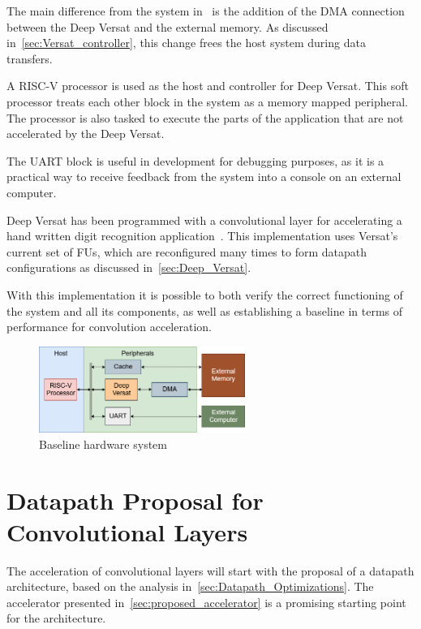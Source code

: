 The main difference from the system in~\cite{VMario:Deep_Versat} is the addition
of the DMA connection between the Deep Versat and the external memory. As
discussed in~\ref{sec:Versat_controller}, this change frees the host system
during data transfers.

A RISC-V processor is used as the host and controller for Deep Versat. This soft
processor treats each other block in the system as a memory mapped
peripheral. The processor is also tasked to execute the parts of the application
that are not accelerated by the Deep Versat.

The UART block is useful in development for debugging purposes, as it is a
practical way to receive feedback from the system into a console on an external
computer.

Deep Versat has been programmed with a convolutional layer for accelerating a
hand written digit recognition application~\cite{VMario:Deep_Versat}. This
implementation uses Versat's current set of FUs, which are reconfigured many
times to form datapath configurations as discussed in~\ref{sec:Deep_Versat}.

With this implementation it is possible to both verify the correct functioning of
the system and all its components, as well as establishing a baseline in terms
of performance for convolution acceleration.

\begin{figure}[!htb]
	\centering
	\includegraphics[width=0.6\textwidth]{Figures/baseline_HW_system.png}
	\caption[Caption for figure in TOC.]{Baseline hardware system}
	\label{fig:baseline_hw_system}
\end{figure}

\section{Datapath Proposal for Convolutional Layers}
\label{sec:planned_datapath_for_conv_layers}
The acceleration of convolutional layers will start with the proposal of a
datapath architecture, based on the analysis
in~\ref{sec:Datapath_Optimizations}. The accelerator presented
in~\ref{sec:proposed_accelerator} is a promising starting point for the
architecture.

